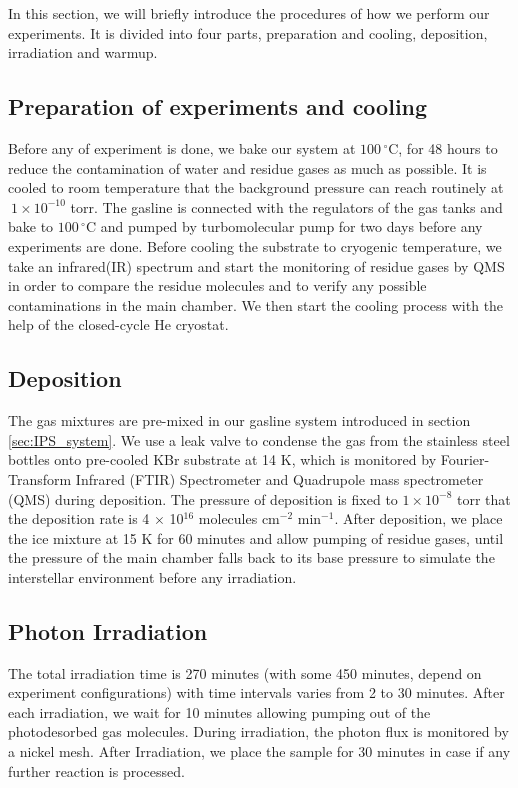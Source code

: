 In this section, we will briefly introduce the  procedures of how we perform our experiments. It is divided into four parts, preparation and cooling, deposition, irradiation and warmup.

\subsection{Preparation of experiments and cooling}
Before any of experiment is done, we bake our system at $100 \,^{\circ}\mathrm{C}$, for 48 hours to reduce the contamination of water and residue gases as much as possible. It is cooled to room temperature that the background pressure can reach routinely at $~ 1 \times 10^{-10}$ torr. The gasline is connected with the regulators of the gas tanks and bake to $100\,^{\circ}\mathrm{C}$ and pumped by turbomolecular pump for two days before any experiments are done. Before cooling the substrate to cryogenic temperature, we take an infrared(IR) spectrum and start the monitoring of residue gases by QMS in order to compare the residue molecules and to verify any possible contaminations in the main chamber. We then start the cooling process with the help of the closed-cycle He cryostat.

\subsection{Deposition}
The gas mixtures are pre-mixed in our gasline system introduced in section \ref{sec:IPS_system}. We use a leak valve to condense the gas from the stainless steel bottles onto pre-cooled KBr substrate at 14 K, which is monitored by Fourier-Transform Infrared (FTIR) Spectrometer and Quadrupole mass spectrometer (QMS) during deposition. The pressure of deposition is fixed to $1 \times 10^{-8}$ torr that the deposition rate is 4 $\times$ 10$^{16}$ molecules cm$^{-2}$ min$^{-1}$. After deposition, we place the ice mixture at 15 K for 60 minutes and allow pumping of residue gases, until the pressure of the main chamber falls back to its base pressure to simulate the interstellar environment before any irradiation.

\subsection{Photon Irradiation}
The total irradiation time is 270 minutes (with some 450 minutes, depend on experiment configurations) with time intervals varies from 2 to 30 minutes. After each irradiation, we wait for 10 minutes allowing pumping out of the photodesorbed gas molecules. During irradiation, the photon flux is monitored by a nickel mesh. After Irradiation, we place the sample for 30 minutes in case if any further reaction is processed.

